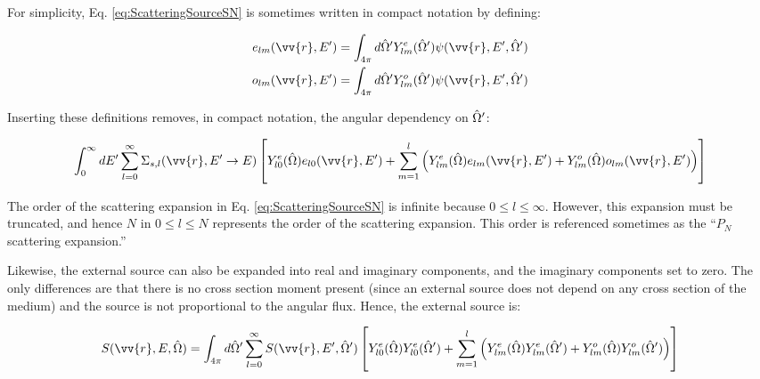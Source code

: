 \begin{tcolorbox}[breakable]
For simplicity, Eq. \eqref{eq:ScatteringSourceSN} is sometimes written in compact notation by defining:

\begin{equation}
\label{eq:FluxMoments31}
\begin{aligned}
e_{lm}(\vv{r},E')=\int_{4\pi}^{}d\hO  'Y_{lm}^e(\hO  ')\psi(\vv{r}, E',\hO  ')\\
o_{lm}(\vv{r},E')=\int_{4\pi}^{}d\hO  'Y_{lm}^o(\hO  ')\psi(\vv{r}, E',\hO  ')\\
\end{aligned}
\end{equation}

Inserting these definitions removes, in compact notation, the angular dependency on \(\hat{\Omega}  '\):

\begin{equation}
\label{eq:ScatteringSourceSNSimple}
\begin{aligned}
\int_{0}^{\infty}dE' \sum_{l=0}^{\infty}\Sigma_{s,l}(\vv{r}, E'\rightarrow E)\left\lbrack Y_{l0}^e(\hO  )e_{l0}(\vv{r},E')+\sum_{m=1}^{l}\left(Y_{lm}^e(\hO  )e_{lm}(\vv{r},E')+Y_{lm}^o(\hO  )o_{lm}(\vv{r},E')\right)\right\rbrack\\
\end{aligned}
\end{equation}
\end{tcolorbox}

The order of the scattering expansion in Eq. \eqref{eq:ScatteringSourceSN} is infinite because \(0\leq l\leq\infty\). However, this expansion must be truncated, and hence \(N\) in \(0\leq l\leq N\) represents the order of the scattering expansion. This order is referenced sometimes as the ``\(P_N\) scattering expansion.'' 

Likewise, the external source can also be expanded into real and imaginary components, and the imaginary components set to zero. The only differences are that there is no cross section moment present (since an external source does not depend on any cross section of the medium) and the source is not proportional to the angular flux. Hence, the external source is:

\begin{equation}
\label{eq:14}
S(\vv{r},E, \hO  )=\int_{4\pi}^{}d\hO  '\sum_{l=0}^{\infty}S(\vv{r},E', \hO  ')\left\lbrack Y_{l0}^e(\hO  )Y_{l0}^e(\hO  ')+\sum_{m=1}^{l}\left(Y_{lm}^e(\hO  )Y_{lm}^{e}(\hO  ')+Y_{lm}^o(\hO  )Y_{lm}^{o}(\hO  ')\right)\right\rbrack 
\end{equation}

